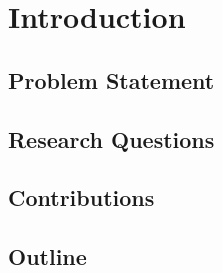 
\chapter{Introduction}

\label{Chapter1} %

\section{Problem Statement}

\section{Research Questions}

\section{Contributions}

\section{Outline}
